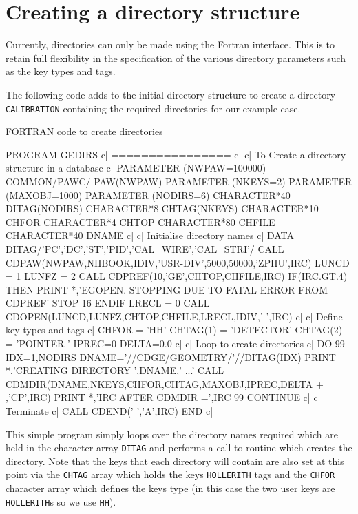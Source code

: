 \section{Creating a directory structure}
Currently, directories can only be made using the Fortran interface.
This is to retain full flexibility in the specification of the
various directory parameters such as the key types and tags.
\par
The following code adds to the initial directory structure to create
a directory {\tt CALIBRATION} containing the required directories for our
example case.
%
\begin{XMPt}{FORTRAN code to create directories}

      PROGRAM GEDIRS
c|    ================
c|
c|    To Create a directory structure in a database
c|
      PARAMETER    (NWPAW=100000)
      COMMON/PAWC/ PAW(NWPAW)
      PARAMETER    (NKEYS=2)
      PARAMETER    (MAXOBJ=1000)
      PARAMETER    (NODIRS=6)
      CHARACTER*40 DITAG(NODIRS)
      CHARACTER*8  CHTAG(NKEYS)
      CHARACTER*10 CHFOR
      CHARACTER*4  CHTOP
      CHARACTER*80 CHFILE
      CHARACTER*40 DNAME
c|
c|    Initialise directory names
c|
      DATA DITAG/'PC','DC','ST','PID','CAL_WIRE','CAL_STRI'/
      CALL CDPAW(NWPAW,NHBOOK,IDIV,'USR-DIV',5000,50000,'ZPHU',IRC)
      LUNCD  = 1
      LUNFZ  = 2
      CALL CDPREF(10,'GE',CHTOP,CHFILE,IRC)
      IF(IRC.GT.4) THEN
         PRINT *,'EGOPEN. STOPPING DUE TO FATAL ERROR FROM CDPREF'
         STOP 16
      ENDIF
      LRECL  = 0
      CALL CDOPEN(LUNCD,LUNFZ,CHTOP,CHFILE,LRECL,IDIV,' ',IRC)
c|
c|    Define key types and tags
c|
      CHFOR = 'HH'
      CHTAG(1) = 'DETECTOR'
      CHTAG(2) = 'POINTER '
      IPREC=0
      DELTA=0.0
c|
c|    Loop to create directories
c|
      DO 99 IDX=1,NODIRS
         DNAME='//CDGE/GEOMETRY/'//DITAG(IDX)
         PRINT *,'CREATING DIRECTORY ',DNAME,' ...'
         CALL CDMDIR(DNAME,NKEYS,CHFOR,CHTAG,MAXOBJ,IPREC,DELTA
     +               ,'CP',IRC)
         PRINT *,'IRC AFTER CDMDIR =',IRC
99    CONTINUE
c|
c|    Terminate
c|
      CALL CDEND(' ','A',IRC)
      END
c|
\end{XMPt}
This simple program simply loops over the directory names required which are
held in the character array {\tt DITAG} and performs a call to routine
 which creates the directory. Note that the keys that each directory
will contain are also set at this point via the {\tt CHTAG} array which holds
the keys {\tt HOLLERITH} tags and the {\tt CHFOR} character array which defines the
keys type (in this case the two user keys are {\tt HOLLERITH}s so we use {\tt HH}).
